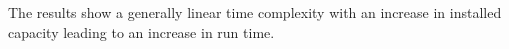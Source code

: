 The results show a generally linear time complexity with an increase in installed capacity leading to an increase in run time.

